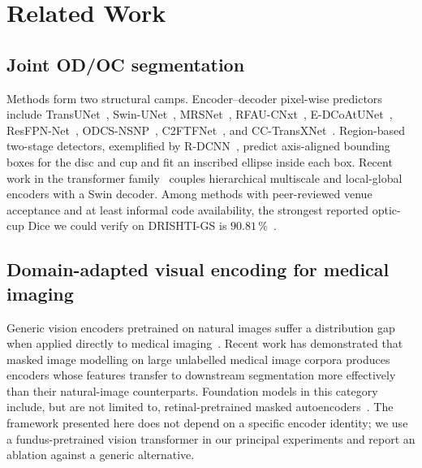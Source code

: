 \documentclass[runningheads]{llncs}
\begin{document}
\section{Related Work}

\subsection{Joint OD/OC segmentation}
Methods form two structural camps. Encoder--decoder pixel-wise predictors include TransUNet~\cite{chen2021transunet}, Swin-UNet~\cite{cao2021swinunet}, MRSNet~\cite{mrsnet2023}, RFAU-CNxt~\cite{rfaucnxt2023}, E-DCoAtUNet~\cite{edcoatunet2025}, ResFPN-Net~\cite{resfpnnet2022}, ODCS-NSNP~\cite{odcsnsnp2023}, C2FTFNet~\cite{c2ftfnet2023}, and CC-TransXNet~\cite{cctransxnet2024}. Region-based two-stage detectors, exemplified by R-DCNN~\cite{li2023rdcnn}, predict axis-aligned bounding boxes for the disc and cup and fit an inscribed ellipse inside each box. Recent work in the transformer family~\cite{dualoptitrans2026} couples hierarchical multiscale and local-global encoders with a Swin decoder. Among methods with peer-reviewed venue acceptance and at least informal code availability, the strongest reported optic-cup Dice we could verify on DRISHTI-GS is $90.81\,\%$~\cite{edcoatunet2025}.

\subsection{Domain-adapted visual encoding for medical imaging}
Generic vision encoders pretrained on natural images suffer a distribution gap when applied directly to medical imaging~\cite{retfound2023nature}. Recent work has demonstrated that masked image modelling on large unlabelled medical image corpora produces encoders whose features transfer to downstream segmentation more effectively than their natural-image counterparts. Foundation models in this category include, but are not limited to, retinal-pretrained masked autoencoders~\cite{retfound2023nature,fundusegmenter2025}. The framework presented here does not depend on a specific encoder identity; we use a fundus-pretrained vision transformer in our principal experiments and report an ablation against a generic alternative.
\end{document}
